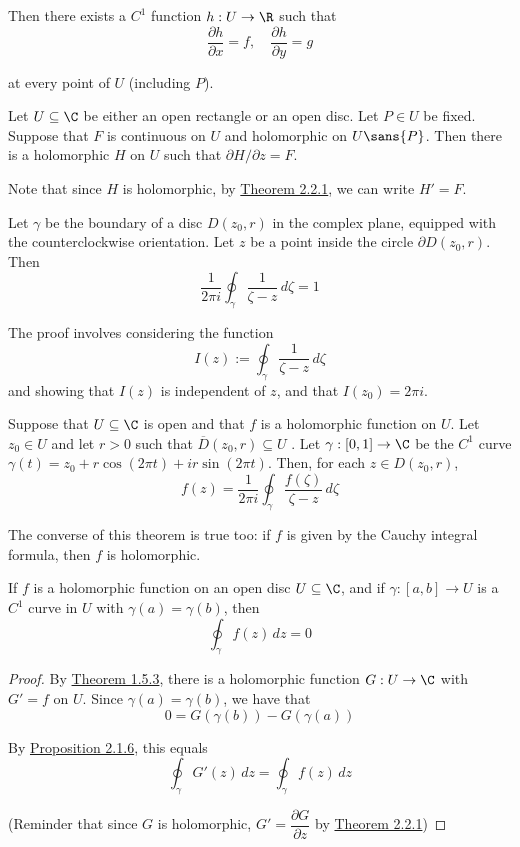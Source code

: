 Then there exists a $C^1$ function $h:U\to\R$ such that
$$
  \frac{\partial h}{\partial x}=f,\quad
  \frac{\partial h}{\partial y}=g
$$

at every point of $U$ (including $P$).

\label{b2d9d89}

Let $U\subseteq\C$ be either an open rectangle or an open disc. Let $P\in U$ be
fixed. Suppose that $F$ is continuous on $U$ and holomorphic on $U\sans{P}$.
Then there is a holomorphic $H$ on $U$ such that $\partial H/\partial z=F$.

Note that since $H$ is holomorphic, by \href{f75e43c}{Theorem 2.2.1}, we can
write $H'=F$.

\label{c6c594a}

Let $\gamma$ be the boundary of a disc $D(z_0,r)$ in the complex plane,
equipped with the counterclockwise orientation. Let $z$ be a point inside the
circle $\partial D(z_0,r)$. Then
$$
  \frac1{2\pi i}\oint_\gamma\frac1{\zeta-z}\,d\zeta=1
$$

The proof involves considering the function
$$
  I(z):=\oint_\gamma\frac1{\zeta-z}\,d\zeta
$$
and showing that $I(z)$ is independent of $z$, and that $I(z_0)=2\pi i$.

\label{e50677f}

Suppose that $U\subseteq\C$ is open and that $f$ is a holomorphic function on
$U$. Let $z_0\in U$ and let $r>0$ such that $\overline D(z_0,r)\subseteq U$ .
Let $\gamma:[0,1]\to\C$ be the $C^1$ curve $\gamma(t)=z_0+r\cos(2\pi
t)+ir\sin(2\pi t)$. Then, for each $z\in D(z_0,r)$,
$$
  f(z)=\frac1{2\pi i}\oint_\gamma\frac{f(\zeta)}{\zeta-z}\,d\zeta
$$

The converse of this theorem is true too: if $f$ is given by the Cauchy
integral formula, then $f$ is holomorphic.

\label{fb87a78}

If $f$ is a holomorphic function on an open disc $U\subseteq\C$, and if
$\gamma:[a,b]\to U$ is a $C^1$ curve in $U$ with $\gamma(a)=\gamma(b)$, then
$$\oint_\gamma f(z)\,dz=0$$

\begin{proof}
  By \href{e7808d1}{Theorem 1.5.3}, there is a holomorphic function
  $G:U\to\C$ with $G'=f$ on $U$. Since $\gamma(a)=\gamma(b)$, we have
  that
  $$
    0=G(\gamma(b))-G(\gamma(a))
  $$

  By \href{c526c09}{Proposition 2.1.6}, this equals
  $$\oint_\gamma G'(z)\,dz=\oint_\gamma f(z)\,dz$$

  (Reminder that since $G$ is holomorphic, $G'=\dfrac{\partial
    G}{\partial z}$ by \href{f75e43c}{Theorem 2.2.1})
\end{proof}

